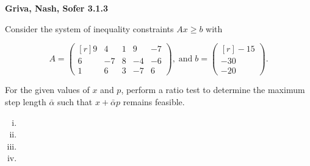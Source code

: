 \textbf{Griva, Nash, Sofer 3.1.3}

Consider the system of inequality constraints $Ax \ge b$ with

$$
  A = \begin{pmatrix*}[r]
    9 &  4 & 1 &  9 & -7 \\
    6 & -7 & 8 & -4 & -6 \\
    1 &  6 & 3 & -7 &  6
  \end{pmatrix*},\; \text{and}\; 
  b = \begin{pmatrix*}[r]
    -15 \\
    -30 \\
    -20
  \end{pmatrix*}.
$$

For the given values of $x$ and $p$, perform a ratio test to determine the maximum step length $\bar{\alpha}$ such that
$x + \bar{\alpha} p$ remains feasible.

\begin{enumerate}[(i)]
  \item 
  \pagebreak
  \item 
  \pagebreak
  \item 
  \pagebreak
  \item 
\end{enumerate}